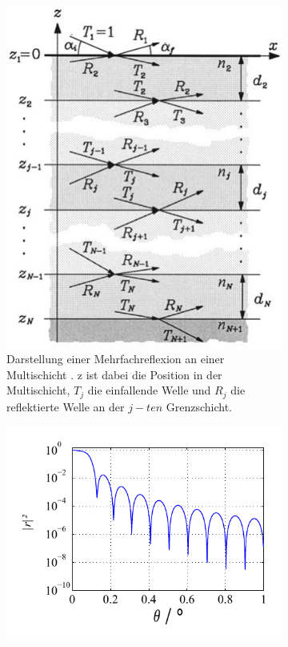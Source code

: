 \begin{figure}
    \begin{subfigure}{0.38\textwidth}
        \centering
        \includegraphics[width=\textwidth]{pictures/multischicht.pdf}
        \caption{Darstellung einer Mehrfachreflexion an einer Multischicht \cite{tolan_xray}.
        z ist dabei die Position in der Multischicht, $T_j$ die einfallende Welle und $R_j$ die reflektierte
        Welle an der $j-ten$ Grenzschicht.}
        \label{fig:multischicht}
    \end{subfigure}
    \begin{subfigure}{0.58\textwidth}
        \centering
        \includegraphics[width=\textwidth]{pictures/kiessig.pdf}

\end{subfigure}
\end{figure}
